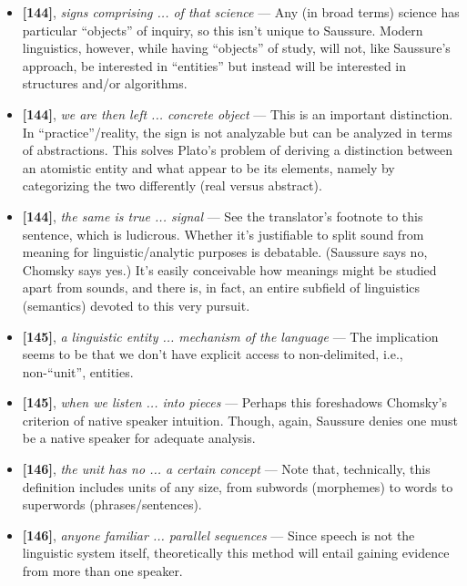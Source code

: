 \documentclass[12pt]{article}
\begin{document}
\begin{itemize}

\item \textbf{[144]}, \textit{signs comprising ... of that science} --- Any (in broad terms) science has particular ``objects'' of inquiry, so this isn't unique to Saussure. Modern linguistics, however, while having ``objects'' of study, will not, like Saussure's approach, be interested in ``entities'' but instead will be interested in structures and/or algorithms.

\item \textbf{[144]}, \textit{we are then left ... concrete object} --- This is an important distinction. In ``practice''/reality, the sign is not analyzable but can be analyzed in terms of abstractions. This solves Plato's problem of deriving a distinction between an atomistic entity and what appear to be its elements, namely by categorizing the two differently (real versus abstract).

\item \textbf{[144]}, \textit{the same is true ... signal} --- See the translator's footnote to this sentence, which is ludicrous. Whether it's justifiable to split sound from meaning for linguistic/analytic purposes is debatable. (Saussure says no, Chomsky says yes.) It's easily conceivable how meanings might be studied apart from sounds, and there is, in fact, an entire subfield of linguistics (semantics) devoted to this very pursuit.

\item \textbf{[145]}, \textit{a linguistic entity ... mechanism of the language} --- The implication seems to be that we don't have explicit access to non-delimited, i.e., non-``unit'', entities.

\item \textbf{[145]}, \textit{when we listen ... into pieces} --- Perhaps this foreshadows Chomsky's criterion of native speaker intuition. Though, again, Saussure denies one must be a native speaker for adequate analysis.

\item \textbf{[146]}, \textit{the unit has no ... a certain concept} --- Note that, technically, this definition includes units of any size, from subwords (morphemes) to words to superwords (phrases/sentences).

\item \textbf{[146]}, \textit{anyone familiar ... parallel sequences} --- Since speech is not the linguistic system itself, theoretically this method will entail gaining evidence from more than one speaker.


\end{itemize}
\end{document}
